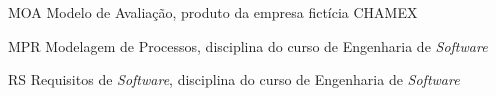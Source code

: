 \begin{siglas}
	\item[MOA]	Modelo de Avaliação, produto da empresa fictícia CHAMEX
	\item[MPR]	Modelagem de Processos, disciplina do curso de Engenharia de \emph{Software}
	\item[RS]	Requisitos de \emph{Software}, disciplina do curso de Engenharia de \emph{Software}
\end{siglas}
